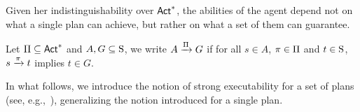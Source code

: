     
    Given her indistinguishability over $\Act^*$, the abilities of the agent depend not on what a single plan can achieve, but rather on what a set of them can guarantee.
    
    \medskip
    
    \begin{definition}
       Let $\plans \subseteq \Act^*$ and $A,G \subseteq \S$, we write $A\reach{\plans} G$ if for all $s\in A$, $\plan\in\plans$ and $t\in \S$,  $s \reach{\plan} t$ implies $t\in G$. 
    \end{definition}
    
    \medskip
    
    In what follows, we introduce the notion of strong executability for a set of plans (see, e.g.,~\cite{AFSVQ23}), generalizing the notion introduced for a single plan.
    
    \medskip
    
    


